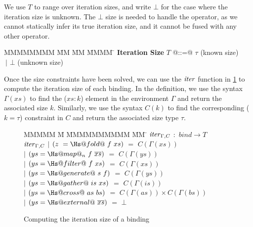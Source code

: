We use $T$ to range over iteration sizes, and write $\bot$ for the case where the iteration size is unknown. The $\bot$ size is needed to handle the \Hs@external@ operator, as we cannot statically infer its true iteration size, and it cannot be fused with any other operator.

\begin{tabbing}
MMMMMMMM \= MM       \= MM \= MMMM \= \kill
\textbf{Iteration Size}
 \> $T$         \> @::=@  \> $\tau$        \> (known size) \\
 \>             \> $~|$   \> $\bot$     \> (unknown size) \\
\end{tabbing}

Once the size constraints have been solved, we can use the $\mathit{iter}$ function in \cref{fig:clustering:iter} to compute the iteration size of each binding.
In the definition, we use the syntax $\Gamma(xs)$ to find the ($xs : k$) element in the environment $\Gamma$ and return the associated size $k$.
Similarly, we use the syntax $C(k)$ to find the corresponding ($k = \tau$) constraint in $C$ and return the associated size type $\tau$.


\begin{figure}
\begin{tabbing}
MMMMM \= M \= MMMMMMMMMM \= MM \= \kill
$\mathit{iter}_{\Gamma,C}$  
        \>$:$\> $bind \rightarrow T$ 
\\[1ex]
$\mathit{iter}_{\Gamma,C}$
        \> $|$  \> $(z~ = \Hs@fold@~ f~xs)$     
                \> $=$ \> $C(\Gamma(xs))$ 
\\
        \> $|$  \> $(ys = \Hs@map@_n~f~\overline{xs})$
                \> $=$ \> $C(\Gamma(ys))$ 
\\
        \> $|$  \> $(ys = \Hs@filter@~f~xs)$    
                \> $=$ \> $C(\Gamma(xs))$ 
\\
        \> $|$  \> $(ys = \Hs@generate@~s~f)$  
                \> $=$ \> $C(\Gamma(ys))$ 
\\
        \> $|$  \> $(ys = \Hs@gather@~is~xs)$    
                \> $=$ \> $C(\Gamma(is))$ 
\\
        \> $|$  \> $(ys = \Hs@cross@~as~bs)$     
                \> $=$ \> $C(\Gamma(as)) \times C(\Gamma(bs))$ 
\\
        \> $|$  \> $(ys = \Hs@external@~\overline{xs})$  
                \> $=$ \> $\bot$ 
\end{tabbing}
\caption{Computing the iteration size of a binding}
\label{fig:clustering:iter}
\end{figure}


